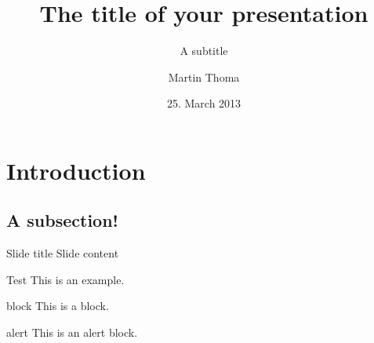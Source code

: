 \documentclass{beamer}
\begin{document}
\title{The title of your presentation}
\subtitle{A subtitle}
\author{Martin Thoma}
\date{25. March 2013}
\subject{Computer Science}

\frame{\titlepage}

\section{Introduction}
\subsection{A subsection!}
\begin{frame}{Slide title}
    Slide content
\end{frame}


\begin{frame}
    \begin{example}{Test}
        This is an example.
    \end{example}
    \begin{block}{block}
        This is a block.
    \end{block}
    \begin{alertblock}{alert}
        This is an alert block.
    \end{alertblock}
\end{frame}
\end{document}
